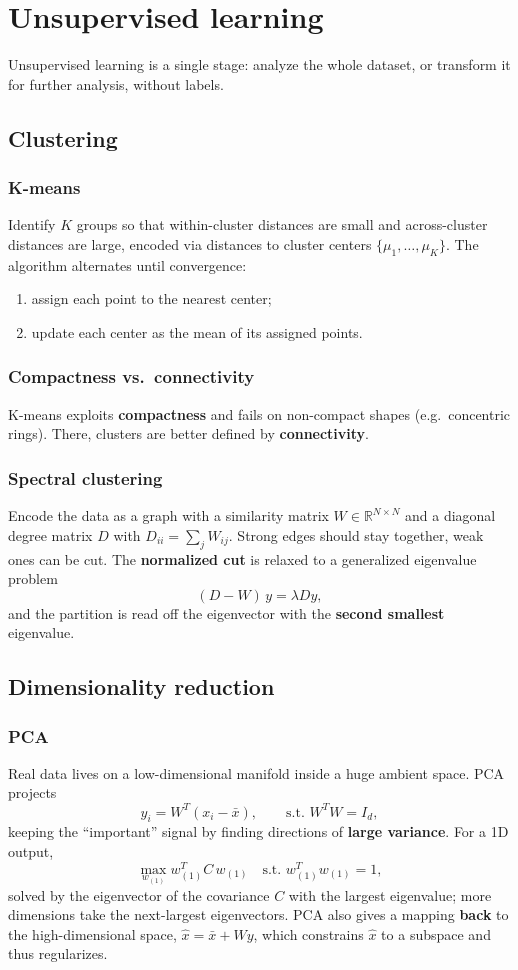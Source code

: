 \section{Unsupervised learning}
Unsupervised learning is a single stage: analyze the whole dataset, or transform
it for further analysis, without labels.

\subsection{Clustering}
\subsubsection{K-means}
Identify $K$ groups so that within-cluster distances are small and across-cluster
distances are large, encoded via distances to cluster centers
$\{\mu_1, \dots, \mu_K\}$. The algorithm alternates until convergence:
\begin{enumerate}
  \item assign each point to the nearest center;
  \item update each center as the mean of its assigned points.
\end{enumerate}

\subsubsection{Compactness vs.\ connectivity}
K-means exploits \textbf{compactness} and fails on non-compact shapes (e.g.\
concentric rings). There, clusters are better defined by \textbf{connectivity}.

\subsubsection{Spectral clustering}
Encode the data as a graph with a similarity matrix $W \in \mathbb{R}^{N\times N}$
and a diagonal degree matrix $D$ with $D_{ii} = \sum_j W_{ij}$. Strong edges
should stay together, weak ones can be cut. The \textbf{normalized cut} is
relaxed to a generalized eigenvalue problem
\[
  (D - W)\,y = \lambda D y ,
\]
and the partition is read off the eigenvector with the \textbf{second smallest}
eigenvalue.

\subsection{Dimensionality reduction}
\subsubsection{PCA}
Real data lives on a low-dimensional manifold inside a huge ambient space. PCA
projects
\[
  y_i = W^T(x_i - \bar{x}), \qquad \text{s.t. } W^T W = I_d ,
\]
keeping the ``important'' signal by finding directions of \textbf{large
variance}. For a 1D output,
\[
  \max_{w_{(1)}} w_{(1)}^T C\, w_{(1)} \quad \text{s.t. } w_{(1)}^T w_{(1)} = 1 ,
\]
solved by the eigenvector of the covariance $C$ with the largest eigenvalue;
more dimensions take the next-largest eigenvectors. PCA also gives a mapping
\textbf{back} to the high-dimensional space, $\hat{x} = \bar{x} + W y$, which
constrains $\hat{x}$ to a subspace and thus regularizes.

